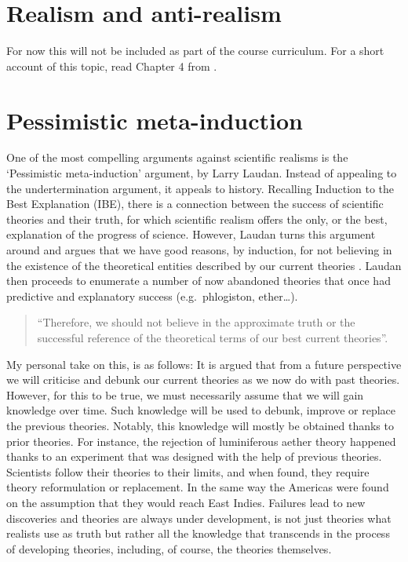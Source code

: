 \documentclass[
]{book}
\begin{document}
\hypertarget{realism}{%
\section{Realism and anti-realism}\label{realism}}

For now this will not be included as part of the course curriculum. For a short account of this topic, read Chapter 4 from \citep{okasha-pos}.

\hypertarget{pessimistic-meta-induction}{%
\section{Pessimistic meta-induction}\label{pessimistic-meta-induction}}

One of the most compelling arguments against scientific realisms is the `Pessimistic meta-induction' argument, by Larry Laudan. Instead of appealing to the undertermination argument, it appeals to history. Recalling Induction to the Best Explanation (IBE), there is a connection between the success of scientific theories and their truth, for which scientific realism offers the only, or the best, explanation of the progress of science. However, Laudan turns this argument around and argues that we have good reasons, by induction, for not believing in the existence of the theoretical entities described by our current theories \citep{ladyman2012understanding}. Laudan then proceeds to enumerate a number of now abandoned theories that once had predictive and explanatory success (e.g.~phlogiston, ether\ldots).

\begin{quote}
``Therefore, we should not believe in the approximate truth or the successful reference of the theoretical terms of our best current theories''.
\end{quote}

My personal take on this, is as follows: It is argued that from a future perspective we will criticise and debunk our current theories as we now do with past theories. However, for this to be true, we must necessarily assume that we will gain knowledge over time. Such knowledge will be used to debunk, improve or replace the previous theories. Notably, this knowledge will mostly be obtained thanks to prior theories. For instance, the rejection of luminiferous aether theory happened thanks to an experiment that was designed with the help of previous theories. Scientists follow their theories to their limits, and when found, they require theory reformulation or replacement. In the same way the Americas were found on the assumption that they would reach East Indies. Failures lead to new discoveries and theories are always under development, is not just theories what realists use as truth but rather all the knowledge that transcends in the process of developing theories, including, of course, the theories themselves.

  
\end{document}
